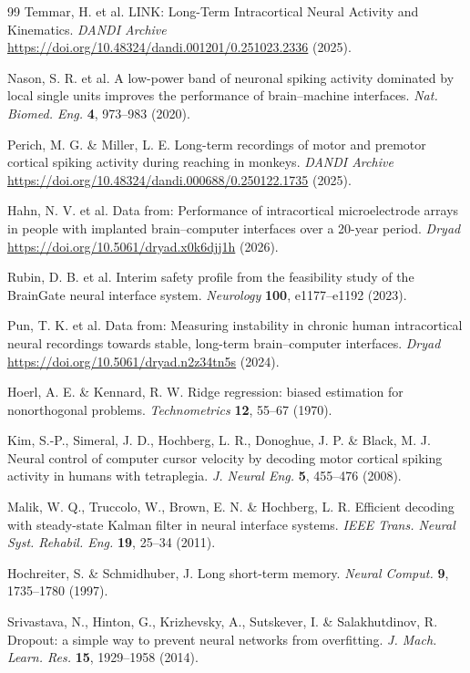 \begin{thebibliography}{99}
 Temmar, H. et al. LINK: Long-Term Intracortical Neural Activity and Kinematics. \textit{DANDI Archive} \url{https://doi.org/10.48324/dandi.001201/0.251023.2336} (2025).

 Nason, S. R. et al. A low-power band of neuronal spiking activity dominated by local single units improves the performance of brain--machine interfaces. \textit{Nat. Biomed. Eng.} \textbf{4}, 973--983 (2020).

 Perich, M. G. \& Miller, L. E. Long-term recordings of motor and premotor cortical spiking activity during reaching in monkeys. \textit{DANDI Archive} \url{https://doi.org/10.48324/dandi.000688/0.250122.1735} (2025).

 Hahn, N. V. et al. Data from: Performance of intracortical microelectrode arrays in people with implanted brain--computer interfaces over a 20-year period. \textit{Dryad} \url{https://doi.org/10.5061/dryad.x0k6djj1h} (2026).

 Rubin, D. B. et al. Interim safety profile from the feasibility study of the BrainGate neural interface system. \textit{Neurology} \textbf{100}, e1177--e1192 (2023).

 Pun, T. K. et al. Data from: Measuring instability in chronic human intracortical neural recordings towards stable, long-term brain--computer interfaces. \textit{Dryad} \url{https://doi.org/10.5061/dryad.n2z34tn5s} (2024).

 Hoerl, A. E. \& Kennard, R. W. Ridge regression: biased estimation for nonorthogonal problems. \textit{Technometrics} \textbf{12}, 55--67 (1970).

 Kim, S.-P., Simeral, J. D., Hochberg, L. R., Donoghue, J. P. \& Black, M. J. Neural control of computer cursor velocity by decoding motor cortical spiking activity in humans with tetraplegia. \textit{J. Neural Eng.} \textbf{5}, 455--476 (2008).

 Malik, W. Q., Truccolo, W., Brown, E. N. \& Hochberg, L. R. Efficient decoding with steady-state Kalman filter in neural interface systems. \textit{IEEE Trans. Neural Syst. Rehabil. Eng.} \textbf{19}, 25--34 (2011).

 Hochreiter, S. \& Schmidhuber, J. Long short-term memory. \textit{Neural Comput.} \textbf{9}, 1735--1780 (1997).

 Srivastava, N., Hinton, G., Krizhevsky, A., Sutskever, I. \& Salakhutdinov, R. Dropout: a simple way to prevent neural networks from overfitting. \textit{J. Mach. Learn. Res.} \textbf{15}, 1929--1958 (2014).


\end{thebibliography}
